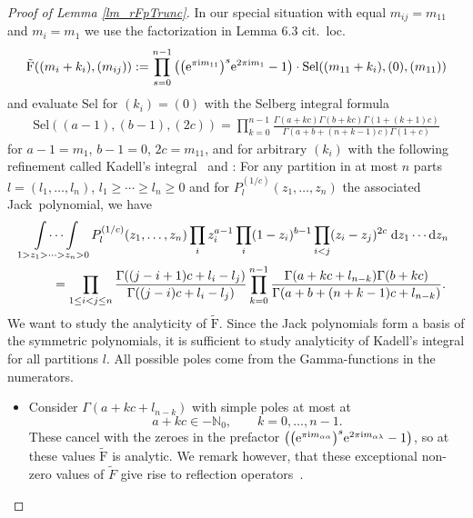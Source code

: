 \documentclass[pdftex]{sigma}%
\numberwithin{equation}{section}
\newcommand{\N}{\mathbb{N}}
\renewcommand{\d}{\mathrm{d}}
\newcommand{\Sel}{\mathrm{Sel}}
\newcommand{\rFp}{\tilde{\mathrm{F}}}
\begin{document}
\begin{proof}[Proof of Lemma \ref{lm_rFpTrunc}]
	 In our special situation with equal $m_{ij}=m_{11}$ and $m_i=m_1$ we use the factorization in Lemma 6.3 cit.~loc.
	\begin{gather*}
	\rFp((m_{i}+k_i),(m_{ij}))
	:=\prod_{s=0}^{n-1} \big( \big({\rm e}^{\pi {\rm i} m_{11}}\big)^s {\rm e}^{2\pi {\rm i} m_{1}} -1 \big) \cdot
	\Sel((m_{11}+k_i),(0),(m_{11}))
	\end{gather*}
	and evaluate $\Sel$ for $(k_i)=(0)$ with the Selberg integral formula \cite{Sel44}
	\begin{gather*}
	\Sel((a-1),(b-1),(2c))  = \prod_{k=0}^{n-1} \frac{\Gamma(a + kc)\Gamma(b + kc)\Gamma(1 + (k+1)c)}{\Gamma(a + b + (n+k-1)c)\Gamma(1 + c)}
	\end{gather*}
	for $a-1=m_{1}$, $b-1=0$, $2c=m_{11}$, and for arbitrary $(k_i)$ with the following refinement called Kadell's integral~\cite{Kad97} and \cite[Section~VI.10]{Mac95}:
	For any partition in at most $n$ parts
	$l=(l_1,\dots,l_n)$, $l_1\geq \cdots \geq l_n\geq 0$ and for $P_{l}^{(1/c)}(z_1,\dots, z_n)$ the associated Jack~polynomial, we have
	\begin{gather*}
	 \idotsint\limits_{1> z_1>\dots >z_{n}> 0}
	P_{l}^{(1/c)}(z_1,\dots, z_n)\prod_i z_i^{a-1}\prod_i (1-z_i)^{b-1}\prod_{i<j} (z_i-z_j)^{2c} \;\d z_1\cdots \d z_{n}\\
	\qquad{} =\prod_{1\leq i<j\leq n}\frac{\Gamma((j-i+1)c+l_i-l_j)}
	{\Gamma((j-i)c+l_i-l_j)}
	\prod_{k=0}^{n-1}
	\frac{\Gamma(a+kc+l_{n-k})\Gamma(b+kc)}
	{\Gamma(a+b+(n+k-1)c+l_{n-k})}.
	\end{gather*}
We want to study the analyticity of $\rFp$. Since the Jack polynomials form a basis of the symmetric polynomials, it is sufficient to study analyticity of Kadell's integral for all partitions $l$. All possible poles come from the Gamma-functions in the numerators.
	\begin{itemize}\itemsep=0pt
		\item Consider $\Gamma(a+kc+l_{n-k})$ with simple poles at most at
		\[a+ k c \in -\N_0, \qquad k=0,\dots,n-1.\]
		These cancel with the zeroes in the prefactor $\big(\big({\rm e}^{\pi {\rm i} m_{\alpha\alpha}}\big)^s {\rm e}^{2\pi {\rm i} m_{\alpha\lambda}} -1\big)$, so at these values $\rFp$ is analytic. We remark however, that these exceptional non-zero values of $\tilde{F}$ give rise to reflection operators~\cite[Section~6.3]{Len17}.
		

\end{itemize}
\end{proof}
\end{document}

